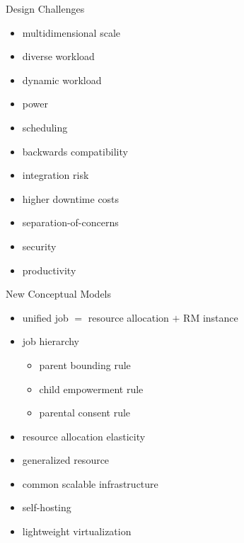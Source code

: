 \documentclass[default,pdf,colorBG,slideColor]{prosper}
\begin{document}
\begin{slide}{Design Challenges}{\small
\begin{minipage}{0.47\textwidth}
\begin{itemize}
  \item{multidimensional scale}
  \item{diverse workload}
  \item{dynamic workload}
  \item{power}
  \item{scheduling}
\end{itemize}
\end{minipage}
\begin{minipage}{0.47\textwidth}
\begin{itemize}
  \item{backwards compatibility}
  \item{integration risk}
  \item{higher downtime costs}
  \item{separation-of-concerns}
  \item{security}
  \item{productivity}
\end{itemize}
\end{minipage}
}\end{slide}
\begin{slide}{New Conceptual Models}{\small
\begin{itemize}
  \item{unified job $=$ resource allocation $+$ RM instance}
  \item{job hierarchy}
  \begin{itemize}
    \item{parent bounding rule}
    \item{child empowerment rule}
    \item{parental consent rule}
  \end{itemize}
  \item{resource allocation elasticity}
  \item{generalized resource}
  \item{common scalable infrastructure}
  \item{self-hosting}
  \item{lightweight virtualization}
\end{itemize}
}\end{slide}
\end{document}
